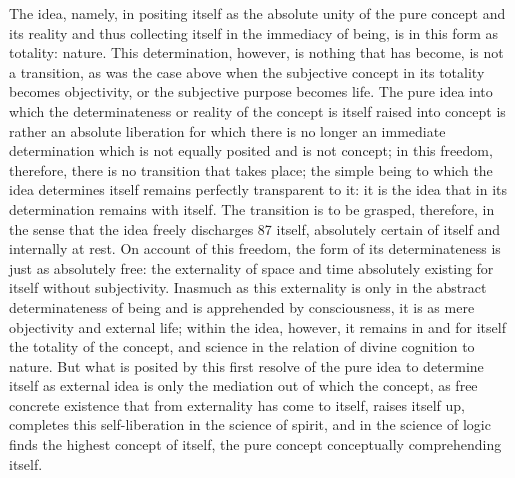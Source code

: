 The idea, namely, in positing itself
as the absolute unity of the pure concept and its reality
and thus collecting itself in the immediacy of being,
is in this form as totality:  nature.
This determination, however, is
nothing that has become, is not a transition, as was the case above when the
subjective concept in its totality becomes objectivity, or the subjective purpose
becomes life. The pure idea into which the determinateness or reality of the
concept is itself raised into concept is rather an absolute liberation for which
there is no longer an immediate determination which is not equally posited
and is not concept; in this freedom, therefore, there is no transition that
takes place; the simple being to which the idea determines itself remains
perfectly transparent to it: it is the idea that in its determination remains
with itself. The transition is to be grasped, therefore, in the sense that the
idea freely discharges 87 itself, absolutely certain of itself and internally at
rest. On account of this freedom, the form of its determinateness is just as
absolutely free: the externality of space and time absolutely existing for itself
without subjectivity.
 Inasmuch as this externality is only in the abstract
determinateness of being and is apprehended by consciousness, it is as mere
objectivity and external life; within the idea, however, it remains in and
for itself the totality of the concept, and science in the relation of divine
cognition to nature. But what is posited by this first resolve of the pure idea
to determine itself as external idea is only the mediation out of which the
concept, as free concrete existence that from externality has come to itself,
raises itself up, completes this self-liberation in the science of spirit, and in
the science of logic finds the highest concept of itself,
the pure concept conceptually comprehending itself.
